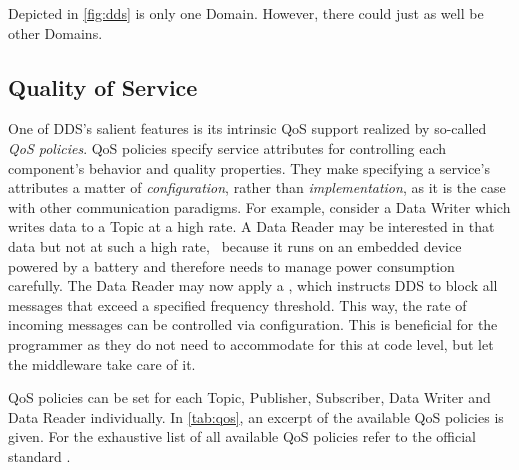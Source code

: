 Depicted in \autoref{fig:dds} is only one Domain. However, there could just as well be other Domains. 


\subsection{Quality of Service}


One of DDS's salient features is its intrinsic QoS support realized by so-called \emph{QoS policies}. QoS policies specify service attributes for controlling each component's behavior and quality properties. They make specifying a service's attributes a matter of \emph{configuration}, rather than \emph{implementation}, as it is the case with other communication paradigms. For example, consider a Data Writer which writes data to a Topic at a high rate. A Data Reader may be interested in that data but not at such a high rate, \eg\ because it runs on an embedded device powered by a battery and therefore needs to manage power consumption carefully. The Data Reader may now apply a \tbf , which instructs DDS to block all messages that exceed a specified frequency threshold. This way, the rate of incoming messages can be controlled via configuration. This is beneficial for the programmer as they do not need to accommodate for this at code level, but let the middleware take care of it.

QoS policies can be set for each Topic, Publisher, Subscriber, Data Writer and Data Reader individually. 
In \autoref{tab:qos}, an excerpt of the available QoS policies is given. For the exhaustive list of all available QoS policies refer to the official standard \cite{dds-1.4-standard}.

